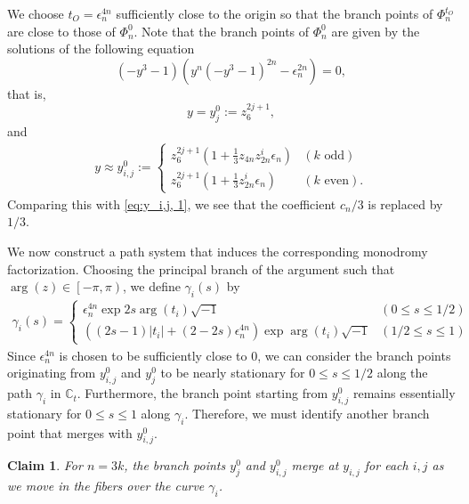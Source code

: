\documentclass[10pt,a4paper,reqno]{amsart}
\newtheorem{claim}[thm]{Claim}
\theoremstyle{definition}
\numberwithin{equation}{section}
\numberwithin{figure}{section}
\newcommand{\C}{\mathbb{C}}
\newcommand{\ep}{\epsilon}
\begin{document}
We choose $t_O={\ep_n^{4n}}$ sufficiently close to the origin so that the branch points of $\Phi_n^{t_O}$ are close to those of $\Phi_n^0$.
Note that the branch points of $\Phi_n^0$ are given by the solutions of the following equation
\[(-y^3-1)(y^n(-y^3-1)^{2n}-{\ep_n^{2n}})=0,\]
that is, \[y=y_j^0:=z_6^{2j+1},\] and
\begin{align}\label{eq:refpoints}
y \approx y_{i,j}^0:= \begin{cases} z_6^{2j+1}(1+\frac{1}{3}z_{4n}z_{2n}^i {\ep_n}) & (k \text{ odd}) \\
 z_6^{2j+1}(1+\frac{1}{3}z_{2n}^i {\ep_n})& (k \text{ even}). \end{cases}
\end{align}
Comparing this with \eqref{eq:y_i,j, 1}, we see that the coefficient $c_n/3$ is replaced by $1/3$.

We now construct a path system that induces the corresponding monodromy factorization.
Choosing the principal branch of the argument such that $\arg(z) \in \left[-\pi , \pi \right)$,
we define $\gamma_{i}(s)$ by
\begin{align} \label{eq:path_system}
\gamma_{i}(s)=
\begin{cases}
{\ep_n^{4n}} \exp{ 2s\arg(t_i) \sqrt{-1}}  & (0\le s\le 1/2) \\
((2s-1)|t_i|+ (2-2s) {\ep_n^{4n}})\exp{ \arg(t_i) \sqrt{-1}}& (1/2 \le s \le 1)
\end{cases}
\end{align}
Since ${\ep_n^{4n}}$ is chosen to be sufficiently close to 0, we can consider the branch points originating from $y_{i,j}^0$ and $y_j^0$ to be nearly stationary for $0\le s \le 1/2$ along the path $\gamma_{i}$ in $\C_t$.
Furthermore, the branch point starting from $y_{i,j}^0$ remains essentially stationary for $0 \le s \le 1$ along $\gamma_{i}$.
Therefore, we must identify another branch point that merges with $y_{i,j}^0$.
\begin{claim}\label{claim:branch_move}
For $n=3k$, the branch points $y_j^0$ and $y_{i,j}^0$ merge at $y_{i,j}$ for each $i,j$ as we move in the fibers over the curve ${\gamma}_{i}$.
\end{claim}
\end{document}
